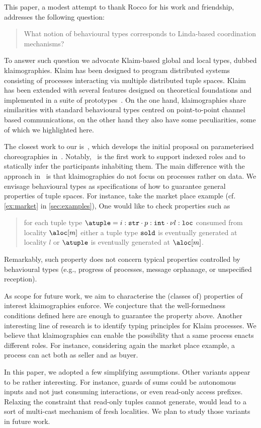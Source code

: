 

This paper, a modest attempt to thank Rocco for his work and
friendship, addresses the following question:
%
\begin{quote}
  What notion of behavioural types corresponds to Linda-based
  coordination mechanisms?
\end{quote}
%
To answer such question we advocate Klaim-based global and local
types, dubbed klaimographies.
%
Klaim has been designed to program distributed systems consisting of
processes interacting via multiple distributed tuple spaces.
%
Klaim has been extended with several features designed on theoretical
foundations and implemented in a suite of
prototypes~\cite{klaim}.
%
On the one hand, klaimographies share similarities with standard
behavioural types centred on point-to-point channel based
communications, on the other hand they also have some peculiarities,
some of which we highlighted here.



The closest work to our is~\cite{chjny19}, which develops the initial
proposal on parameterised choreographies in~\cite{ydbh10,dybh12}.
%
Notably,~\cite{chjny19} is the first work to support indexed roles and
to statically infer the participants inhabiting them.
%
The main difference with the approach in~\cite{chjny19} is that
klaimographies do not focus on processes rather on data.
%
We envisage behavioural types as specifications of how to guarantee
general properties of tuple spaces.
%
For instance, take the market place example (cf. \cref{ex:market} in
\cref{sec:examples}),
%
One would like to check properties such as
\begin{quote}
  for each tuple type
  $\atuple = {{i : \asort[str]} \cdot {p : \asort[int]} \cdot {\nu l :
      \asort[loc]}}$ consumed from locality $\aloc[m]$ either a tuple type
  $\asort[sold]$ is eventually generated at locality $l$ or $\atuple$
  is eventually generated at $\aloc[m]$.
\end{quote}
%
Remarkably, such property does not concern typical properties
controlled by behavioural types (e.g., progress of processes, message
orphanage, or unspecified reception).

As scope for future work, we aim to characterise the (classes of)
properties of interest klaimographies enforce.
%
We conjecture that the well-formedness conditions defined here
are enough to guarantee the property above.
%
Another interesting line of research is to identify typing principles
for Klaim processes.
%
We believe that klaimographies can enable the possibility that a same
process enacts different roles.
%
For instance, considering again the market place example, a process
can act both as seller and as buyer.

In this paper, we adopted a few simplifying assumptions.
%
Other variants appear to be rather interesting.
%
For instance, guards of sums could be autonomous inputs and not just
consuming interactions, or even read-only access prefixes.
%
Relaxing the constraint that read-only tuples cannot generate, would
lead to a sort of multi-cast mechanism of fresh localities.
%
We plan to study those variants in future work.


